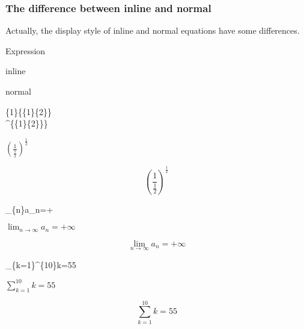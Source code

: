 \begin{frame}
	\frametitle{The difference between inline and normal}
	Actually, the display style of inline and normal equations have some differences.
	\begin{example}
		\begin{minipage}{0.48\linewidth}
			\centering Expression
		\end{minipage}
		\begin{minipage}{0.24\linewidth}
			\centering inline
		\end{minipage}
		\begin{minipage}{0.24\linewidth}
			\centering normal
		\end{minipage}
		\vfill
		\begin{minipage}{0.48\linewidth}
			\{1\}\{\{1\}\{2\}\}\\
			\^{}\{\{1\}\{2\}\}\}
		\end{minipage}
		\begin{minipage}{0.24\linewidth}
			\centering $\left(\frac{1}{\frac{1}{2}}\right)^{\frac{1}{2}}$
		\end{minipage}
		\begin{minipage}{0.24\linewidth}
			$$\left(\frac{1}{\frac{1}{2}}\right)^{\frac{1}{2}}$$
		\end{minipage}
		\vfill
		\begin{minipage}{0.48\linewidth}
			\_\{n\}a\_n=+
		\end{minipage}
		\begin{minipage}{0.24\linewidth}
			\centering $\lim_{n\to\infty}a_n=+\infty$
		\end{minipage}
		\begin{minipage}{0.24\linewidth}
			$$\lim_{n\to\infty}a_n=+\infty$$
		\end{minipage}
		\vfill
		\begin{minipage}{0.48\linewidth}
			\_\{k=1\}\^{}\{10\}k=55
		\end{minipage}
		\begin{minipage}{0.24\linewidth}
			\centering $\sum_{k=1}^{10}k=55$
		\end{minipage}
		\begin{minipage}{0.24\linewidth}
			$$\sum_{k=1}^{10}k=55$$
		\end{minipage}
	\end{example}
\end{frame} 

